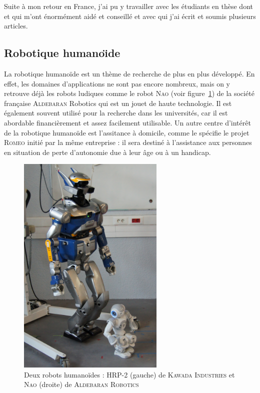 Suite à mon retour en France, j'ai pu y travailler avec les étudiants en thèse dont \nicolas et \thomas qui m'ont énormément aidé et conseillé et avec qui j'ai écrit et soumis plusieurs articles. 


\subsection{Robotique humano\"\i de}
\label{sub:robotique}

La robotique humanoïde est un thème de recherche de plus en plus développé. En effet, les domaines d'applications ne sont pas encore nombreux, mais on y retrouve déjà les robots ludiques comme le robot N\textsc{ao} (voir figure~\ref{fig:robots}) de la société française A\textsc{ldebaran} Robotics qui est un jouet de haute technologie.
Il est également souvent utilisé pour la recherche dans les universités, car il est abordable financièrement et assez facilement utilisable.
Un autre centre d'intérêt de la robotique humanoïde est l'assitance à domicile, comme le spécifie le projet R\textsc{omeo} initié par la même entreprise : il sera destiné à l'assistance aux personnes en situation de perte d'autonomie due à leur âge ou à un handicap.

\begin{figure}[h]
\begin{center}
\includegraphics[width=7.0cm]{images/robots.jpg}
\caption{Deux robots humanoïdes : HRP-2 (gauche) de K\textsc{awada} I\textsc{ndustries} et N\textsc{ao} (droite) de A\textsc{ldebaran} R\textsc{obotics}}
\label{fig:robots}
\end{center}
\end{figure}

